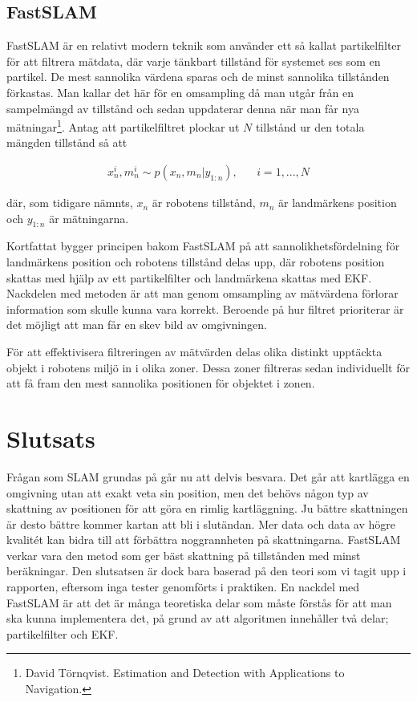 \documentclass[a4paper,12pt,fleqn]{article}
\begin{document}
\subsection{FastSLAM}
FastSLAM är en relativt modern teknik som använder ett så kallat partikelfilter för att filtrera mätdata, där varje tänkbart tillstånd för systemet ses som en partikel. De mest sannolika värdena sparas och de minst sannolika tillstånden förkastas. Man kallar det här för en omsampling då man utgår från en sampelmängd av tillstånd och sedan uppdaterar denna när man får nya mätningar\footnote{David Törnqvist. Estimation and Detection with Applications to Navigation.}. Antag att partikelfiltret plockar ut $N$ tillstånd ur den totala mängden tillstånd så att 

\begin{gather}
x^i_n,m^i_n \sim p(x_n,m_n|y_{1:n}),\;\;\;\;\;\; i = 1, ..., N
\end{gather}

där, som tidigare nämnts, $x_n$ är robotens tillstånd, $m_n$ är landmärkens position och $y_{1:n}$ är mätningarna.  

Kortfattat bygger principen bakom FastSLAM på att sannolikhetsfördelning för landmärkens position och robotens tillstånd delas upp, där robotens position skattas med hjälp av ett partikelfilter och landmärkena skattas med EKF. Nackdelen med metoden är att man genom omsampling av mätvärdena förlorar information som skulle kunna vara korrekt. Beroende på hur filtret prioriterar är det möjligt att man får en skev bild av omgivningen. 

För att effektivisera filtreringen av mätvärden delas olika distinkt upptäckta objekt i robotens miljö in i olika zoner. Dessa zoner filtreras sedan individuellt för att få fram den mest sannolika positionen för objektet i zonen.

\newpage
\section{Slutsats}

Frågan som SLAM grundas på går nu att delvis besvara. Det går att kartlägga en omgivning utan att exakt veta sin position, men det behövs någon typ av skattning av positionen för att göra en rimlig kartläggning. Ju bättre skattningen är desto bättre kommer kartan att bli i slutändan. Mer data och data av högre kvalitét kan bidra till att förbättra noggrannheten på skattningarna. FastSLAM verkar vara den metod som ger bäst skattning på tillstånden med minst beräkningar. Den slutsatsen är dock bara baserad på den teori som vi tagit upp i rapporten, eftersom inga tester genomförts i praktiken. En nackdel med FastSLAM är att det är många teoretiska delar som måste förstås för att man ska kunna implementera det, på grund av att algoritmen innehåller två delar; partikelfilter och EKF.
\end{document}
